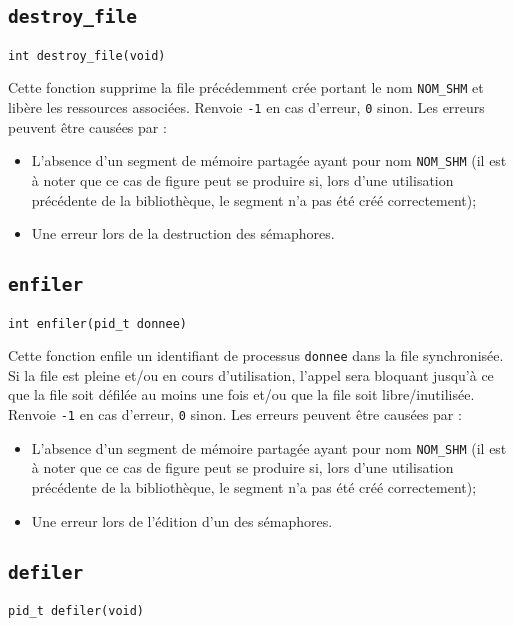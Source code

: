 \documentclass[12pt]{article}
\begin{document}
    \subsection{\texttt{destroy\_file}}
    \begin{center}
        \texttt{int destroy\_file(void)}
    \end{center}

    Cette fonction supprime la file précédemment crée portant le nom \texttt{NOM\_SHM} et libère les ressources associées.
    Renvoie \texttt{-1} en cas d'erreur, \texttt{0} sinon. Les erreurs peuvent être causées par :
    \begin{itemize}
        \item L'absence d'un segment de mémoire partagée ayant pour nom \texttt{NOM\_SHM} (il est à noter que ce cas de figure peut se produire si, lors d'une utilisation précédente de la bibliothèque, le segment n'a pas été créé correctement);
        \item Une erreur lors de la destruction des sémaphores.
    \end{itemize}

    \subsection{\texttt{enfiler}}
    \begin{center}
        \texttt{int enfiler(pid\_t donnee)}
    \end{center}

    Cette fonction enfile un identifiant de processus \texttt{donnee} dans la file synchronisée. Si la file est pleine et/ou en cours d'utilisation, l'appel sera bloquant jusqu'à ce que la file soit défilée au moins une fois et/ou que la file soit libre/inutilisée.
    Renvoie \texttt{-1} en cas d'erreur, \texttt{0} sinon. Les erreurs peuvent être causées par :
    \begin{itemize}
        \item L'absence d'un segment de mémoire partagée ayant pour nom \texttt{NOM\_SHM} (il est à noter que ce cas de figure peut se produire si, lors d'une utilisation précédente de la bibliothèque, le segment n'a pas été créé correctement);
        \item Une erreur lors de l'édition d'un des sémaphores.
    \end{itemize}

    \subsection{\texttt{defiler}}
    \begin{center}
        \texttt{pid\_t defiler(void)}
    \end{center}
\end{document}
